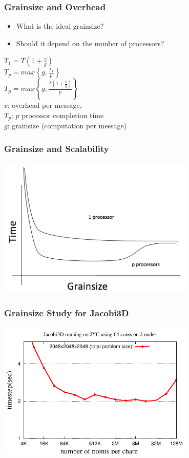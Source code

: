\begin{frame}
  \frametitle{Grainsize and Overhead}
  \begin{itemize}
    \item What is the ideal grainsize?
    \item Should it depend on the number of processors?
    
  \end{itemize}
  \begin{center}
    $T_1 = T \left( 1 + \frac{v}{g} \right)$\\
    $T_p = max \left\{ g, \frac{T_1}{p} \right\}$\\
    $T_p = max \left\{ g, \frac{T\left( 1+ \frac{v}{g} \right)}{p} \right\}$\\
    $v$: overhead per message,\\
    $T_p$: $p$ processor completion time\\
    $g$: grainsize (computation per message)
  \end{center}
\end{frame}

\begin{frame}
  \frametitle{Grainsize and Scalability}
  \begin{center} \includegraphics[width=0.7\textwidth]{figures/grain2.png} \end{center}
\end{frame}

\begin{frame}
  \frametitle{Grainsize Study for Jacobi3D}
  \begin{center}
  \includegraphics[width=0.7\textwidth]{figures/jacobi-grainsize-halfmemory.pdf} \end{center}
\end{frame}

